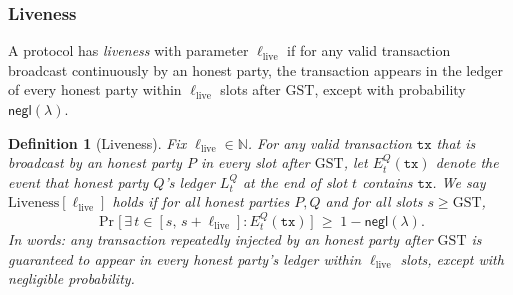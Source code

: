 \documentclass[11pt]{article}
\newtheorem{definition}[theorem]{Definition}
\newcommand{\negl}{\ensuremath{\mathsf{negl}}\xspace}
\newcommand{\tx}{\ensuremath{\mathtt{tx}}\xspace}
\begin{document}
\subsubsection{Liveness}



A protocol has \emph{liveness} with parameter $\ell_{\mathrm{live}}$ if for any valid transaction broadcast continuously by an honest party,
the transaction appears in the ledger of every honest party within $\ell_{\mathrm{live}}$ slots after $\mathrm{GST}$,
except with probability $\negl(\lambda)$.

\begin{definition}[Liveness]
Fix $\ell_{\mathrm{live}} \in \mathbb{N}$. For any valid transaction $\tx$ that is
broadcast by an honest party $P$ in every slot after $\mathrm{GST}$, let
$E_t^Q(\tx)$ denote the event that honest party $Q$'s ledger $L_t^Q$ at the end of slot $t$
contains $\tx$. We say $\mathrm{Liveness}[\ell_{\mathrm{live}}]$ holds if for all honest parties $P,Q$
and for all slots $s \ge \mathrm{GST}$,
\[
\Pr\!\Big[\, \exists\, t \in [s,\,s+\ell_{\mathrm{live}}] : E_t^Q(\tx) \,\Big] \;\ge\; 1-\negl(\lambda).
\]
In words: any transaction repeatedly injected by an honest party after $\mathrm{GST}$
is guaranteed to appear in every honest party’s ledger within $\ell_{\mathrm{live}}$ slots,
except with negligible probability.
\end{definition}
\end{document}
